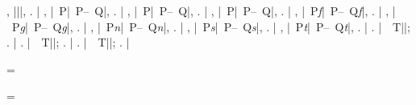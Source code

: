 
                           {, |}{||, }{. |}
                           {, |}{~P|~P--~Q|, }{. |}
                           {, |}{~P|~P--~Q|, }{. |}
                           {, |}{~P|~P--~Q|, }{. |}
                           {, |}{~P\+\emph{f}|~P--~Q\+\emph{f}|, }{. |}
                           {, |}{~P\+\emph{g}|~P--~Q\+\emph{g}|, }{. |}
                           {, |}{~P\+\emph{n}|~P--~Q\+\emph{n}|, }{. |}
                           {, |}{~P\+\emph{s}|~P--~Q\+\emph{s}|, }{. |}
                           {, |}{~P\+\emph{t}|~P--~Q\+\emph{t}|, }{. |}
                           {. |\See\ }{~T||; }{. |}
                           {. |\Seealso\ }{~T||; }{. |}
                           {. |\Consult\ }{~T||; }{. |}




\setflag \zindexing = \false


\def \produceindex #1#2{%
  {\processdesign{\index}{#1}%
   \immediate\openout \zwritea = #2.zzh\relax
   \immediate\write \zwritea {root \jobname}%
   \immediate\write \zwritea {type #1}%
   \immediate\write \zwritea {divisions {\the\divisions}}%
   \immediate\write \zwritea {locators {\the\locators}}%
   \immediate\write \zwritea {\the\indexparams}%
   \maplist{\immediate\write \zwritea {define-locator ##1}}{\zixloclist}%
   \immediate\closeout \zwritea}%
  \global\setflag \zindexing = \true}


\setflag \zixdivopen = \false


\def \zindexinit {%
  \if \zindexing
    \immediate\openout \zixrootfile = \jobname.zzi\relax
    \immediate\write \zixrootfile 
      {\zcomment Raw index entry file for book `\jobname'.}%
  \fi}

